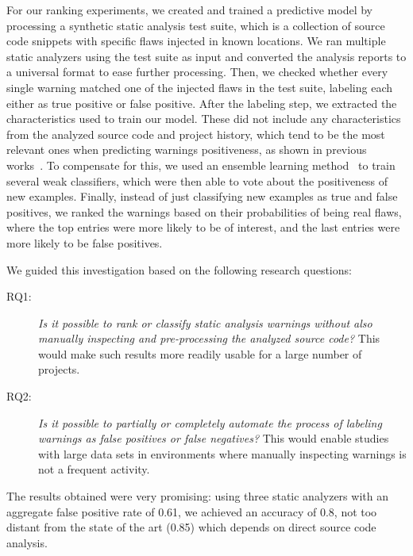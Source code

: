
For our ranking experiments, we created and trained a
predictive model by processing a synthetic static analysis test
suite, which is a collection of source code snippets with specific flaws
injected in known locations. We ran multiple static analyzers using the test
suite as input and converted the analysis reports to a universal format to
ease further processing.
Then, we checked whether every single warning matched one of the injected flaws in
the test suite, labeling each either as true positive or
false positive. After the labeling step, we extracted the
characteristics used to train our model. These did not include
any characteristics from the analyzed source code and project history, which
tend to be the most relevant ones when predicting warnings positiveness, as
shown in previous works~\cite{yoon2014reducing, jung2005taming}. To compensate
for this, we used an ensemble learning method~\cite{aima} to train several
weak classifiers, which were then able to vote about the positiveness of new examples.
Finally, instead of just classifying new examples as true and false positives,
we ranked the warnings based on their probabilities of being real flaws, where
the top entries were more likely to be of interest, and the last entries were more
likely to be false positives.

We guided this investigation based on the following research questions:

\begin{description}
  \item [RQ1:] \textit{Is it possible to rank or classify static analysis warnings without also
  manually inspecting and pre-processing the analyzed source code?} This would make
  such results more readily usable for a large number of projects.

  \item [RQ2:] \textit{Is it possible to partially or completely automate the process of
    labeling warnings as false positives or false negatives?} This would enable
    studies with large data sets in environments where manually inspecting
    warnings is not a frequent activity.
\end{description}

The results obtained were very promising: using three static analyzers with an
aggregate false positive rate of 0.61, we achieved an accuracy of 0.8, not too
distant from the state of the art (0.85) which depends on direct source code
analysis.

